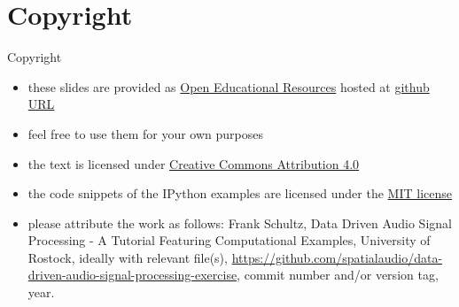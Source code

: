 \documentclass[mathserif, aspectratio=1610]{intbeamer}
\begin{document}
\section{Copyright}
\begin{frame}{Copyright}
\begin{itemize}
\item these slides are provided as \href{https://en.wikipedia.org/wiki/Open_educational_resources}{Open Educational Resources} hosted at \href{https://github.com/spatialaudio/data-driven-audio-signal-processing-exercise}{github URL}
\item feel free to use them for your own purposes
\item the text is licensed under \href{https://creativecommons.org/licenses/by/4.0/}{Creative Commons Attribution 4.0}
\item the code snippets of the IPython examples are licensed under the \href{https://opensource.org/licenses/MIT}{MIT license}
\item please attribute the work as follows: Frank Schultz, Data Driven Audio Signal Processing - A Tutorial Featuring Computational Examples, University of Rostock,  ideally with relevant file(s), \href{https://github.com/spatialaudio/data-driven-audio-signal-processing-exercise}{https://github.com/spatialaudio/data-driven-audio-signal-processing-exercise}, commit number and/or version tag, year.
\end{itemize}

\end{frame}
%
\end{document}
